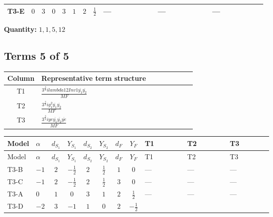 \documentclass[8pt]{article}
\begin{document}
\begin{landscape}
\begin{longtable}{@{}llcccccc >{\raggedright\arraybackslash}p{0.21\linewidth} >{\raggedright\arraybackslash}p{0.21\linewidth} >{\raggedright\arraybackslash}p{0.21\linewidth}@{}}
\midrule
T3-E & $0$ & $3$ & $0$ & $3$ & $1$ & $2$ & $\frac{1}{2}$ & --- & --- & --- \\
\midrule
\bottomrule
\end{longtable}
\clearpage
\noindent\textbf{Quantity: }$\mathrm{1,1,5,12}$\par\smallskip
\subsection*{Terms 5 of 5}
\begin{center}
\begin{tabular}{@{}c >{\raggedright\arraybackslash}p{0.82\linewidth}@{}}
\toprule
Column & Representative term structure \\
\midrule
T1 & \(\displaystyle \frac{3^{\frac{3}{4}} i lambda12Inv1 \overline{y_{1}} \overline{y_{2}}}{MF}\) \\
\midrule
T2 & \(\displaystyle \frac{3^{\frac{3}{4}} i g_{1}^{2} \overline{y_{1}} \overline{y_{2}}}{MF}\) \\
\midrule
T3 & \(\displaystyle \frac{3^{\frac{3}{4}} i ye \overline{y_{1}} \overline{y_{2}} \overline{ye}}{MF}\) \\
\midrule
\bottomrule
\end{tabular}
\end{center}
\smallskip
\tiny
\begin{longtable}{@{}llcccccc >{\raggedright\arraybackslash}p{0.21\linewidth} >{\raggedright\arraybackslash}p{0.21\linewidth} >{\raggedright\arraybackslash}p{0.21\linewidth}@{}}
\toprule
Model & $\alpha$ & $d_{S_1}$ & $Y_{S_1}$ & $d_{S_2}$ & $Y_{S_2}$ & $d_F$ & $Y_F$ & T1 & T2 & T3 \\
\midrule
\endfirsthead
\toprule
Model & $\alpha$ & $d_{S_1}$ & $Y_{S_1}$ & $d_{S_2}$ & $Y_{S_2}$ & $d_F$ & $Y_F$ & T1 & T2 & T3 \\
\midrule
\endhead
T3-B & $-1$ & $2$ & $-\frac{1}{2}$ & $2$ & $\frac{1}{2}$ & $1$ & $0$ & --- & --- & --- \\
\midrule
T3-C & $-1$ & $2$ & $-\frac{1}{2}$ & $2$ & $\frac{1}{2}$ & $3$ & $0$ & --- & --- & --- \\
\midrule
T3-A & $0$ & $1$ & $0$ & $3$ & $1$ & $2$ & $\frac{1}{2}$ & --- & --- & --- \\
\midrule
T3-D & $-2$ & $3$ & $-1$ & $1$ & $0$ & $2$ & $-\frac{1}{2}$ & \scriptsize\adjustbox{max width=\linewidth}{$\begin{gathered} - \frac{3^{\frac{3}{4}} i lambda12Inv1 \overline{y_{1}} \overline{y_{2}}}{6 MF}\end{gathered}$} & \scriptsize\adjustbox{max width=\linewidth}{$\begin{gathered} - \frac{3^{\frac{3}{4}} i g_{1}^{2} \overline{y_{1}} \overline{y_{2}}}{8 MF}\end{gathered}$} & \scriptsize\adjustbox{max width=\linewidth}{$\begin{gathered} \frac{3^{\frac{3}{4}} i ye \overline{y_{1}} \overline{y_{2}} \overline{ye}}{12 MF}\end{gathered}$} \\

\end{longtable}
\end{landscape}
\end{document}

